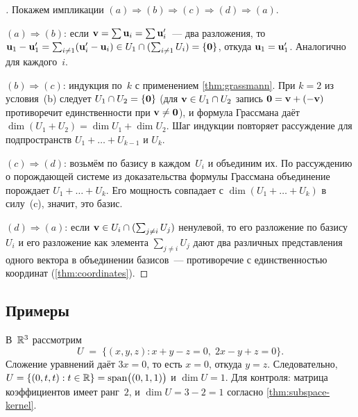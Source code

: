 \begin{proof}[]
Покажем импликации $(a) \Rightarrow (b) \Rightarrow (c) \Rightarrow (d) \Rightarrow (a)$.

$(a) \Rightarrow (b)$: если $\mathbf{v} = \sum \mathbf{u}_i = \sum \mathbf{u}'_i$~---
два разложения, то
$\mathbf{u}_1 - \mathbf{u}'_1 = \sum_{i \neq 1}(\mathbf{u}'_i - \mathbf{u}_i) \in U_1 \cap (\sum_{i \neq 1} U_i) = \{\mathbf{0}\}$,
откуда $\mathbf{u}_1 = \mathbf{u}'_1$. Аналогично для каждого~$i$.

$(b) \Rightarrow (c)$: индукция по~$k$ с применением \cref{thm:grassmann}.
При $k = 2$ из условия~(b) следует $U_1 \cap U_2 = \{\mathbf{0}\}$ (для
$\mathbf{v} \in U_1 \cap U_2$ запись $\mathbf{0} = \mathbf{v} + (-\mathbf{v})$
противоречит единственности при $\mathbf{v} \neq \mathbf{0}$), и формула
Грассмана даёт $\dim(U_1 + U_2) = \dim U_1 + \dim U_2$. Шаг индукции
повторяет рассуждение для подпространств $U_1 + \dots + U_{k-1}$ и
$U_k$.

$(c) \Rightarrow (d)$: возьмём по базису в каждом~$U_i$ и объединим их.
По рассуждению о порождающей системе из доказательства формулы
Грассмана объединение порождает $U_1 + \dots + U_k$. Его мощность
совпадает с $\dim(U_1 + \dots + U_k)$ в силу~(c), значит, это базис.

$(d) \Rightarrow (a)$: если $\mathbf{v} \in U_i \cap (\sum_{j \neq i} U_j)$
ненулевой, то его разложение по базису~$U_i$ и его разложение как
элемента $\sum_{j \neq i} U_j$ дают два различных представления одного
вектора в объединении базисов~--- противоречие с единственностью
координат (\cref{thm:coordinates}).
\end{proof}

\subsection*{Примеры}

\begin{example}
\label{ex:subspace-from-system}
В~$\mathbb{R}^3$ рассмотрим
\[
  U \;=\; \{(x, y, z) : x + y - z = 0,\; 2x - y + z = 0\}.
\]
Сложение уравнений даёт $3x = 0$, то есть $x = 0$, откуда $y = z$.
Следовательно, $U = \{(0, t, t) : t \in \mathbb{R}\} = \operatorname{span}\bigl((0, 1, 1)\bigr)$
и $\dim U = 1$. Для контроля: матрица коэффициентов имеет ранг~$2$, и
$\dim U = 3 - 2 = 1$ согласно \cref{thm:subspace-kernel}.
\end{example}

